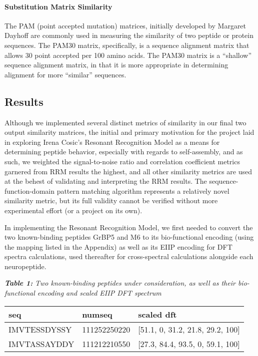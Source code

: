 \documentclass[]{article}
\let\oldparagraph\paragraph
\renewcommand{\paragraph}[1]{\oldparagraph{#1}\mbox{}}
\begin{document}
\hypertarget{substitution-matrix-similarity}{%
\paragraph{Substitution Matrix Similarity}\label{substitution-matrix-similarity}}

The PAM (point accepted mutation) matrices, initially developed by Margaret Dayhoff are commonly used in measuring the similarity of two peptide or protein sequences. The PAM30 matrix, specifically, is a sequence alignment matrix that allows 30 point accepted per 100 amino acids. The PAM30 matrix is a ``shallow'' sequence alignment matrix, in that it is more appropriate in determining alignment for more ``similar'' sequences. 

\hypertarget{results}{%
\subsection{Results}\label{results}}

Although we implemented several distinct metrics of similarity in our final two output similarity matrices, the initial and primary motivation for the project laid in exploring Irena Cosic's Resonant Recognition Model as a means for determining peptide behavior, especially with regards to self-assembly, and as such, we weighted the signal-to-noise ratio and correlation coefficient metrics garnered from RRM results the highest, and all other similarity metrics are used at the behest of validating and interpreting the RRM results. The sequence-function-domain pattern matching algorithm represents a relatively novel similarity metric, but its full validity cannot be verified without more experimental effort (or a project on its own).

In implementing the Resonant Recognition Model, we first needed to convert the two known-binding peptides GrBP5 and M6 to its bio-functional encoding (using the mapping listed in the Appendix) as well as its EIIP encoding for DFT spectra calculations, used thereafter for cross-spectral calculations alongside each neuropeptide.

\textbf{\emph{Table 1:}} \emph{Two known-binding peptides under consideration, as well as their bio-functional encoding and scaled EIIP DFT spectrum}

\begin{longtable}[]{@{}lll@{}}
\toprule
\textbf{seq} & numseq & scaled dft\tabularnewline
\midrule
\endhead
IMVTESSDYSSY & 111252250220 & [51.1, 0,  31.2,  21.8, 29.2, 100]\tabularnewline
IMVTASSAYDDY & 111212210550 & [27.3, 84.4, 93.5, 0, 59.1, 100]\tabularnewline
\bottomrule
\end{longtable}
\end{document}
